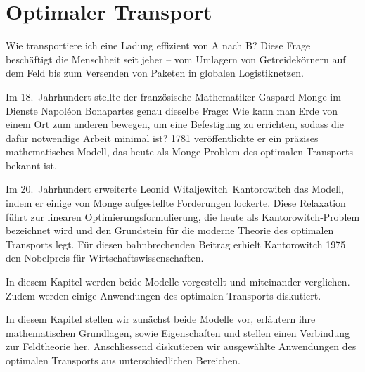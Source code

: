 %
%
%
%
\newcommand{\wasserstein}[1][p]{\mathcal{W}_{#1}}
\chapter{Optimaler Transport\label{chapter:mongekant}}
\begin{refsection}

\noindent
Wie transportiere ich eine Ladung effizient von A nach B?
Diese Frage beschäftigt die Menschheit seit jeher --
vom Umlagern von Getreidekörnern auf dem Feld
bis zum Versenden von Paketen in globalen Logistiknetzen.

Im 18.~Jahrhundert stellte der französische Mathematiker Gaspard Monge
im Dienste Napoléon Bonapartes genau dieselbe Frage:
Wie kann man Erde von einem Ort zum anderen bewegen,
um eine Befestigung zu errichten,
sodass die dafür notwendige Arbeit minimal ist?
1781 veröffentlichte er ein präzises mathematisches Modell,
das heute als Monge‑Problem des optimalen Transports bekannt ist.

Im 20.~Jahrhundert erweiterte Leonid Witaljewitch~Kantorowitch das Modell,
indem er einige von Monge aufgestellte Forderungen lockerte.
Diese Relaxation führt zur linearen Optimierungsformulierung,
die heute als Kantorowitch‑Problem bezeichnet wird
und den Grundstein für die moderne Theorie des optimalen Transports legt.
Für diesen bahnbrechenden Beitrag erhielt Kantorowitch 1975
den Nobelpreis für Wirtschaftswissenschaften.

In diesem Kapitel werden beide Modelle vorgestellt und miteinander verglichen.
Zudem werden einige Anwendungen des optimalen Transports diskutiert.

In diesem Kapitel stellen wir zunächst beide Modelle vor,
erläutern ihre mathematischen Grundlagen, sowie Eigenschaften und
stellen einen Verbindung zur Feldtheorie her.
Anschliessend diskutieren wir ausgewählte Anwendungen des optimalen Transports
aus unterschiedlichen Bereichen.







\printbibliography[heading=subbibliography]
\end{refsection}
